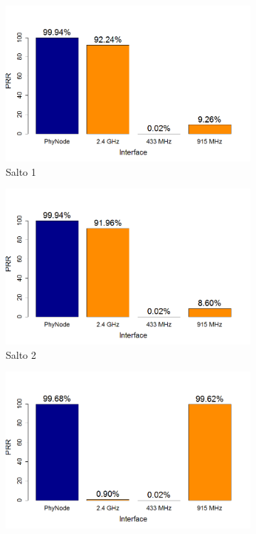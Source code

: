\documentclass[
	12pt,				%
	openright,			%
	oneside,
	a4paper,			%
	english,			%
	french,				%
	spanish,			%
	brazil				%
	]{abntex2}
\begin{document}
\begin{figure}[htb]
	\centering
	\caption{PRR (Triangle)}
	\label{fig_prr_opt}
	\begin{subfigure}{.5\textwidth}
		\centering
		\includegraphics[width=.98\linewidth]{PRR_OPT_Salto1}
		\captionsetup{width=.9\textwidth}
		\caption{Salto 1}
		\label{prr_opt_s1}
	\end{subfigure}%
	\begin{subfigure}{.5\textwidth}
		\centering
		\includegraphics[width=.98\linewidth]{PRR_OPT_Salto2}
		\captionsetup{width=.9\textwidth}
		\caption{Salto 2}
		\label{prr_opt_s2}
	\end{subfigure}
	\begin{subfigure}{.5\textwidth}
		\centering
		\includegraphics[width=.98\linewidth]{PRR_OPT_Salto3}

\end{subfigure}
\end{figure}
\end{document}

